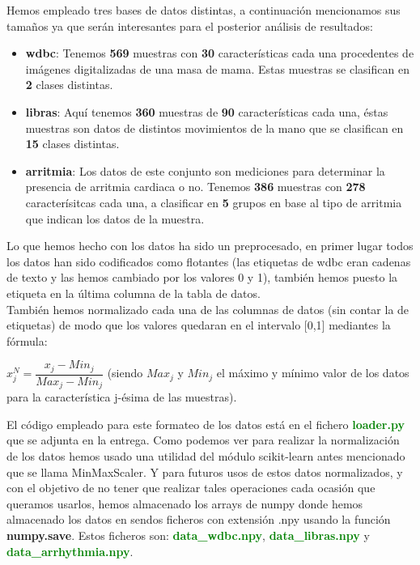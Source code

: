 \documentclass[10pt,a4paper]{article}
\begin{document}
Hemos empleado tres bases de datos distintas, a continuación mencionamos sus tamaños ya que serán interesantes para el posterior análisis de resultados:\\

\begin{itemize}
\item \textbf{wdbc}: Tenemos \textbf{569} muestras con \textbf{30} características cada una procedentes de imágenes digitalizadas de una masa de mama. Estas muestras se clasifican en \textbf{2} clases distintas.
\item \textbf{libras}: Aquí tenemos \textbf{360} muestras de \textbf{90} características cada una, éstas muestras son datos de distintos movimientos de la mano que se clasifican en \textbf{15} clases distintas.
\item \textbf{arritmia}: Los datos de este conjunto son mediciones para determinar la presencia de arritmia cardiaca o no. Tenemos \textbf{386} muestras con \textbf{278} caracterísitcas cada una, a clasificar en \textbf{5} grupos en base al tipo de arritmia que indican los datos de la muestra.
\end{itemize}

Lo que hemos hecho con los datos ha sido un preprocesado, en primer lugar todos los datos han sido codificados como flotantes (las etiquetas de wdbc eran cadenas de texto y las hemos cambiado por los valores 0 y 1), también hemos puesto la etiqueta en la última columna de la tabla de datos.\\

También hemos normalizado cada una de las columnas de datos (sin contar la de etiquetas) de modo que los valores quedaran en el intervalo [0,1] mediantes la fórmula:\\

\begin{center}
$x_j^N = \dfrac{x_j - Min_j}{Max_j-Min_j}$ (siendo $Max_j$ y $Min_j$ el máximo y mínimo valor de los datos para la característica j-ésima de las muestras).
\end{center}

El código empleado para este formateo de los datos está en el fichero \textbf{\textcolor{green}{loader.py}} que se adjunta en la entrega. Como podemos ver para realizar la normalización de los datos hemos usado una utilidad del módulo scikit-learn antes mencionado que se llama MinMaxScaler. Y para futuros usos de estos datos normalizados, y con el objetivo de no tener que realizar tales operaciones cada ocasión que queramos usarlos, hemos almacenado los arrays de numpy donde hemos almacenado los datos en sendos ficheros con extensión .npy usando la función \textbf{numpy.save}. Estos ficheros son: \textbf{\textcolor{green}{data\_wdbc.npy}}, \textbf{\textcolor{green}{data\_libras.npy}} y \textbf{\textcolor{green}{data\_arrhythmia.npy}}.\\
\end{document}
